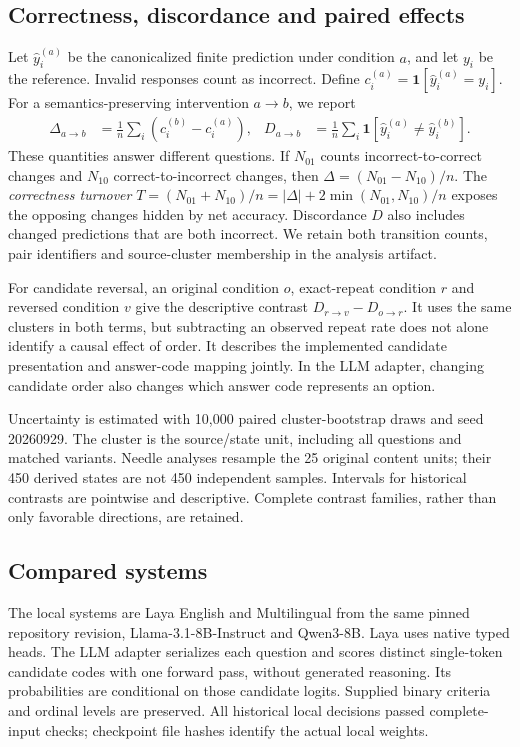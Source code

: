 \subsection{Correctness, discordance and paired effects}
Let $\hat y_i^{(a)}$ be the canonicalized finite prediction under condition $a$, and let $y_i$ be the reference. Invalid responses count as incorrect. Define $c_i^{(a)}=\mathbf{1}[\hat y_i^{(a)}=y_i]$. For a semantics-preserving intervention $a\!\to\!b$, we report
\begin{align}
\Delta_{a\to b}&=\frac{1}{n}\sum_i(c_i^{(b)}-c_i^{(a)}), &
D_{a\to b}&=\frac{1}{n}\sum_i\mathbf{1}[\hat y_i^{(a)}\ne\hat y_i^{(b)}].
\end{align}
These quantities answer different questions. If $N_{01}$ counts incorrect-to-correct changes and $N_{10}$ correct-to-incorrect changes, then $\Delta=(N_{01}-N_{10})/n$. The \emph{correctness turnover} $T=(N_{01}+N_{10})/n=|\Delta|+2\min(N_{01},N_{10})/n$ exposes the opposing changes hidden by net accuracy. Discordance $D$ also includes changed predictions that are both incorrect. We retain both transition counts, pair identifiers and source-cluster membership in the analysis artifact.

For candidate reversal, an original condition $o$, exact-repeat condition $r$ and reversed condition $v$ give the descriptive contrast $D_{r\to v}-D_{o\to r}$. It uses the same clusters in both terms, but subtracting an observed repeat rate does not alone identify a causal effect of order. It describes the implemented candidate presentation and answer-code mapping jointly. In the LLM adapter, changing candidate order also changes which answer code represents an option.

Uncertainty is estimated with 10,000 paired cluster-bootstrap draws and seed 20260929. The cluster is the source/state unit, including all questions and matched variants. Needle analyses resample the 25 original content units; their 450 derived states are not 450 independent samples. Intervals for historical contrasts are pointwise and descriptive. Complete contrast families, rather than only favorable directions, are retained.

\subsection{Compared systems}
The local systems are Laya English and Multilingual from the same pinned repository revision, Llama-3.1-8B-Instruct and Qwen3-8B. Laya uses native typed heads. The LLM adapter serializes each question and scores distinct single-token candidate codes with one forward pass, without generated reasoning. Its probabilities are conditional on those candidate logits. Supplied binary criteria and ordinal levels are preserved. All historical local decisions passed complete-input checks; checkpoint file hashes identify the actual local weights.


